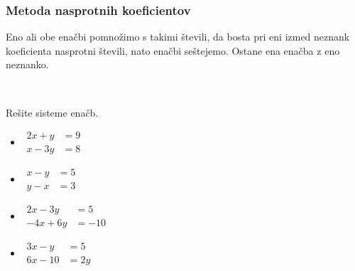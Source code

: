             \subsubsection*{Metoda nasprotnih koeficientov}
                Eno ali obe enačbi pomnožimo s takimi števili, da bosta pri eni izmed neznank koeficienta nasprotni števili, nato enačbi seštejemo.
                Ostane ena enačba z eno neznanko.
            

~~~
        


        
            \begin{naloga}
                Rešite sisteme enačb.
                \begin{itemize}
                    
                        \item $\begin{aligned}
                            2x+y&=9 \\ x-3y&=8
                        \end{aligned}$ 
                        \item $\begin{aligned}
                            x-y&=5 \\ y-x&=3
                        \end{aligned}$ 
                        \item $\begin{aligned}
                            2x-3y&=5 \\ -4x+6y&=-10
                        \end{aligned}$ 
                        \item $\begin{aligned}
                            3x-y&=5 \\ 6x-10&=2y
                        \end{aligned}$ 
                    

                \end{itemize}
            \end{naloga}
        


